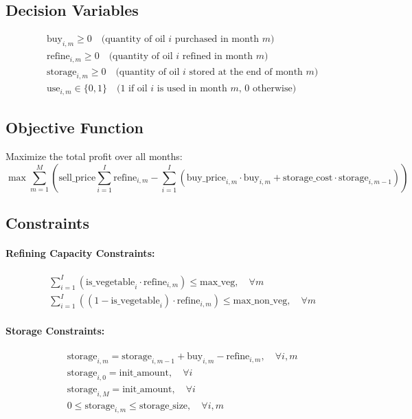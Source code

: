 \documentclass{article}
\begin{document}
\subsection*{Decision Variables}
\begin{align*}
  & \text{buy}_{i,m} \geq 0 \quad \text{(quantity of oil $i$ purchased in month $m$)} \\
  & \text{refine}_{i,m} \geq 0 \quad \text{(quantity of oil $i$ refined in month $m$)} \\
  & \text{storage}_{i,m} \geq 0 \quad \text{(quantity of oil $i$ stored at the end of month $m$)} \\
  & \text{use}_{i,m} \in \{0,1\} \quad \text{(1 if oil $i$ is used in month $m$, 0 otherwise)}
\end{align*}

\subsection*{Objective Function}
Maximize the total profit over all months:
\[
\max \sum_{m=1}^{M} \left( \text{sell\_price} \sum_{i=1}^{I} \text{refine}_{i,m} - \sum_{i=1}^{I} \left( \text{buy\_price}_{i,m} \cdot \text{buy}_{i,m} + \text{storage\_cost} \cdot \text{storage}_{i,m-1} \right) \right)
\]

\subsection*{Constraints}

\paragraph{Refining Capacity Constraints:}
\begin{align*}
  & \sum_{i=1}^{I} (\text{is\_vegetable}_{i} \cdot \text{refine}_{i,m}) \leq \text{max\_veg}, \quad \forall m \\
  & \sum_{i=1}^{I} ((1-\text{is\_vegetable}_{i}) \cdot \text{refine}_{i,m}) \leq \text{max\_non\_veg}, \quad \forall m
\end{align*}

\paragraph{Storage Constraints:}
\begin{align*}
  & \text{storage}_{i,m} = \text{storage}_{i,m-1} + \text{buy}_{i,m} - \text{refine}_{i,m}, \quad \forall i, m \\
  & \text{storage}_{i,0} = \text{init\_amount}, \quad \forall i \\
  & \text{storage}_{i,M} = \text{init\_amount}, \quad \forall i \\
  & 0 \leq \text{storage}_{i,m} \leq \text{storage\_size}, \quad \forall i, m
\end{align*}
\end{document}
